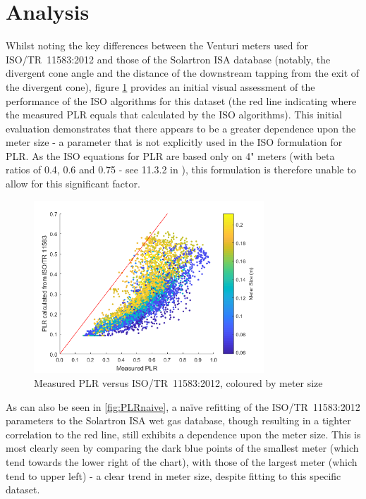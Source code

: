 \documentclass[journal]{IEEEtran}
\begin{document}
\section{Analysis}

Whilst noting the key differences between the Venturi meters used for ISO/TR~11583:2012 and those of the Solartron ISA database (notably, the divergent cone angle and the distance of the downstream tapping from the exit of the divergent cone), figure \ref{fig:PLR2} provides an initial visual assessment of the performance of the ISO algorithms for this dataset (the red line indicating where the measured PLR equals that calculated by the ISO algorithms). This initial evaluation demonstrates that there appears to be a greater dependence upon the meter size - a parameter that is not explicitly used in the ISO formulation for \acrshort{PLR}. As the ISO equations for PLR are based only on 4" meters (with beta ratios of 0.4, 0.6 and 0.75 - see 11.3.2 in \cite{Reader-Harris2015}), this formulation is therefore unable to allow for this significant factor. 

\begin{figure}[h]
\centering
\includegraphics[width=3.4in]{PLR2.png}
\caption[]{ Measured PLR versus ISO/TR~11583:2012, coloured by meter size }
\label{fig:PLR2}
\end{figure}

As can also be seen in \ref{fig:PLRnaive}, a na{\"i}ve refitting of the ISO/TR~11583:2012 parameters to the Solartron ISA wet gas database, though resulting in a tighter correlation to the red line, still exhibits a dependence upon the meter size.  This is most clearly seen by comparing the dark blue points of the smallest meter (which tend towards the lower right of the chart), with those of the largest meter (which tend to upper left) - a clear trend in meter size, despite fitting to this specific dataset.
\end{document}
